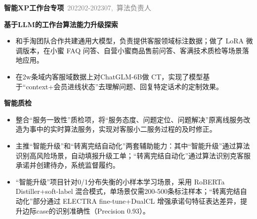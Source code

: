 \documentclass{resume}
\newenvironment{graybox}{%
  \begin{mdframed}[backgroundcolor=lightgray,linewidth=0pt,innerleftmargin=8pt,innerrightmargin=8pt,innertopmargin=6pt,innerbottommargin=6pt]
}{%
  \end{mdframed}
}
\begin{document}
\vspace{0.3em}
\begin{graybox}

\vspace{0.5em}
\noindent{\color{gray!40}\rule{\textwidth}{0.2pt}}

\textbf{智能XP工作台专项}\ {\small\textcolor{gray}{\hfill 202202-202307,\ 算法负责人}}

\vspace{0.3em}
{\small\textbf{基于LLM的工作台算法能力升级探索}}
\begin{onehalfspacing}
\begin{itemize}
  \item 和手淘团队合作共建通用大模型，负责提供客服领域标注数据；做了 LoRA 微调版本，在小蜜 FAQ 问答、自营小蜜商品售前问答、客满技术质检等场景落地应用。
  \item 在2w条域内客服域数据上对ChatGLM-6B做 CT，实现了模型基于“context+会员进线状态”去理解问题、回复特定话术的定制效果。
\end{itemize}
\end{onehalfspacing}

\vspace{0.3em}
{\small\textbf{智能质检}}
\begin{onehalfspacing}
\begin{itemize}
  \item 整合“服务一致性”质检项，将“服务态度、问题定位、问题解决”原离线服务改造为事中的实时算法服务，实现对客服小二服务过程的及时修正。
  \item 主推“智能升级”和“转离完结自动化”两套辅助能力：其中“智能升级”通过算法识别高风险场景，自动填报升级工单；“转离完结自动化”通过算法识别克客服承诺并创建待办，系统监督履约。
  \item “智能升级”项目针对0/1分布失衡的小样本学习场景，采用 RoBERTa Distiller+soft-label 混合模式，单场景仅需200-500条标注样本；“转离完结自动化”部分通过 ELECTRA fine-tune+DualCL 增强承诺句特征表达差异，提升边际case的识别准确性（Precision 0.93）。
\end{itemize}
\end{onehalfspacing}


\end{graybox}
\end{document}
